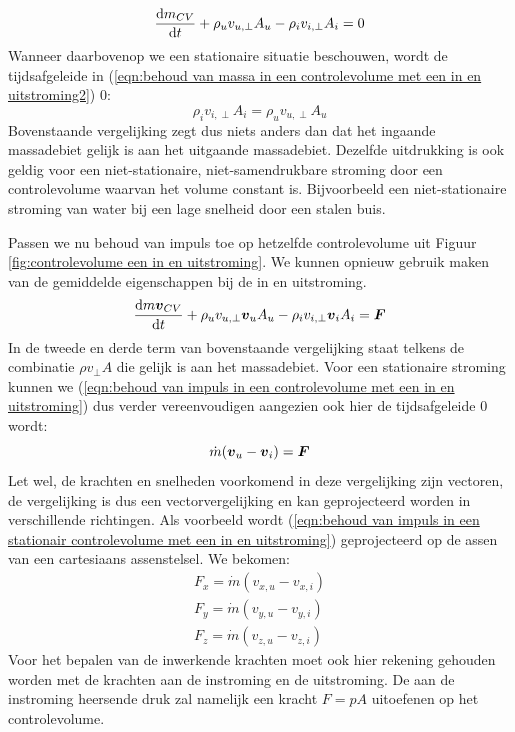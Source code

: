 \begin{equation}
	\dfrac{\mathrm{d} m_{CV}}{\mathrm{d} t} + \rho_{u} v_{u,\perp} A_{u} - \rho_{i} v_{i,\perp} A_{i} = 0
	\label{eqn:behoud van massa in een controlevolume met een in en uitstroming2}
\end{equation}
Wanneer daarbovenop we een stationaire situatie beschouwen, wordt de tijdsafgeleide in (\ref{eqn:behoud van massa in een controlevolume met een in en uitstroming2}) $0$:
\begin{equation}
	\rho_i v_{i,\perp} A_i = \rho_u v_{u,\perp} A_u
	\label{eqn:behoud van massa in een stationair controlevolume met een in en uitstroming}
\end{equation}
Bovenstaande vergelijking zegt dus niets anders dan dat het ingaande massadebiet gelijk is aan het uitgaande massadebiet. Dezelfde uitdrukking is ook geldig voor een niet-stationaire, niet-samendrukbare stroming door een controlevolume waarvan het volume constant is. Bijvoorbeeld een niet-stationaire stroming van water bij een lage snelheid door een stalen buis.

Passen we nu behoud van impuls toe op hetzelfde controlevolume uit Figuur \ref{fig:controlevolume een in en uitstroming}. We kunnen opnieuw gebruik maken van de gemiddelde eigenschappen bij de in en uitstroming.
\begin{equation}
	 \dfrac{\mathrm{d} m \boldsymbol{v}_{CV}}{\mathrm{d} t} + \rho_{u} v_{u,\perp} \boldsymbol{v}_{u} A_{u} - \rho_{i} v_{i,\perp} \boldsymbol{v}_{i} A_{i} = \boldsymbol{F}
	\label{eqn:behoud van impuls in een controlevolume met een in en uitstroming}
\end{equation}
In de tweede en derde term van bovenstaande vergelijking staat telkens de combinatie $\rho v_{\perp} A$ die gelijk is aan het massadebiet. Voor een stationaire stroming kunnen we (\ref{eqn:behoud van impuls in een controlevolume met een in en uitstroming}) dus verder vereenvoudigen aangezien ook hier de tijdsafgeleide $0$ wordt:
\begin{equation}
	\dot{m} (\boldsymbol{v}_u-\boldsymbol{v}_i) = \boldsymbol{F}
	\label{eqn:behoud van impuls in een stationair controlevolume met een in en uitstroming}
\end{equation}
Let wel, de krachten en snelheden voorkomend in deze vergelijking zijn vectoren, de vergelijking is dus een vectorvergelijking en kan geprojecteerd worden in verschillende richtingen. Als voorbeeld wordt (\ref{eqn:behoud van impuls in een stationair controlevolume met een in en uitstroming}) geprojecteerd op de assen van een cartesiaans assenstelsel. We bekomen:
\begin{eqnarray}
	F_x = \dot{m} (v_{x,u}-v_{x,i}) \nonumber \\
	F_y = \dot{m} (v_{y,u}-v_{y,i}) \\
	F_z = \dot{m} (v_{z,u}-v_{z,i}) \nonumber
	\label{eqn:behoud van impuls in een stationair controlevolume met een in en uitstroming geprojecteerd}
\end{eqnarray}
Voor het bepalen van de inwerkende krachten moet ook hier rekening gehouden worden met de krachten aan de instroming en de uitstroming. De aan de instroming heersende druk zal namelijk een kracht $F = p A$ uitoefenen op het controlevolume.

